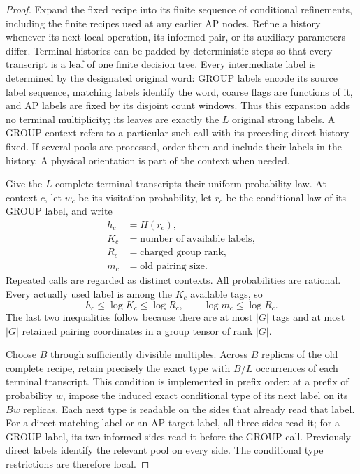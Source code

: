 \documentclass[11pt]{article}
\numberwithin{equation}{section}
\theoremstyle{definition}
\theoremstyle{remark}
\begin{document}
\begin{proof}
Expand the fixed recipe into its finite sequence of conditional refinements,
including the finite recipes used at any earlier AP nodes.  Refine a history
whenever its next local operation, its informed pair, or its auxiliary
parameters differ.  Terminal histories can be padded by deterministic steps
so that every transcript is a leaf of one finite decision tree.  Every
intermediate label is determined by the designated original word: GROUP
labels encode its source label sequence, matching labels identify the word,
coarse flags are functions of it, and AP labels are fixed by its disjoint
count windows.  Thus this expansion adds no terminal multiplicity; its leaves
are exactly the $L$ original strong labels.  A GROUP
context refers to a particular such call with its preceding direct history
fixed.  If several pools are processed, order them and include their labels
in the history.  A physical orientation is part of the context when needed.

Give the $L$ complete terminal transcripts their uniform probability law.
At context $c$, let $w_c$ be its visitation probability, let $r_c$ be the
conditional law of its GROUP label, and write
\[
\begin{aligned}
 h_c&=H(r_c),\\
 K_c&=\text{number of available labels},\\
 R_c&=\text{charged group rank},\\
 m_c&=\text{old pairing size}.
\end{aligned}
\]
Repeated calls are regarded as distinct contexts.  All probabilities are
rational.  Every actually used label is among the $K_c$ available tags, so
\begin{equation}
 h_c\le\log K_c\le\log R_c,
 \qquad \log m_c\le\log R_c.
\label{val:group-inequalities}
\end{equation}
The last two inequalities follow because there are at most $|G|$ tags and at
most $|G|$ retained pairing coordinates in a group tensor of rank $|G|$.

Choose $B$ through sufficiently divisible multiples.  Across $B$ replicas of
the old complete recipe, retain precisely the exact type with $B/L$
occurrences of each terminal transcript.  This condition is implemented in
prefix order: at a prefix of probability $w$, impose the induced exact
conditional type of its next label on its $Bw$ replicas.  Each next type is
readable on the sides that already read that label.  For a direct matching
label or an AP target label, all three sides read it; for a GROUP label, its
two informed sides read it before the GROUP call.  Previously direct labels
identify the relevant pool on every side.  The conditional type restrictions
are therefore local.


\end{proof}
\end{document}
